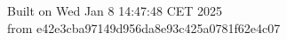 {\noindent Built on Wed Jan  8 14:47:48 CET 2025} \\ 
 {\noindent from e42e3cba97149d956da8e93c425a0781f62e4c07}
